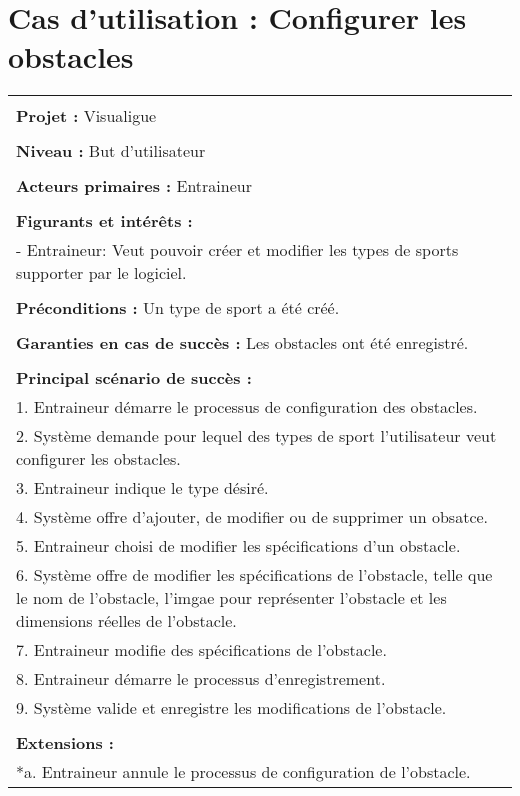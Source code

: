 \section{Cas d'utilisation : Configurer les obstacles}
\begin{longtable}{|p{16cm}|}
	\hline
	\\
	\textbf{Projet :} Visualigue\\
	\\
	\textbf{Niveau :} But d'utilisateur\\
	\\
	\textbf{Acteurs primaires :} Entraineur\\
	\\
	\textbf{Figurants et intérêts :} \\
	- Entraineur: Veut pouvoir créer et modifier les types de sports supporter par le logiciel.\\
	\\
	\textbf{Préconditions :} Un type de sport a été créé.\\
	\\
	\textbf{Garanties en cas de succès :} Les obstacles ont été enregistré.\\
	\\
	\textbf{Principal scénario de succès :}\\
	1. Entraineur démarre le processus de configuration des obstacles.\\
	2. Système demande pour lequel des types de sport l'utilisateur veut configurer les obstacles.\\
	3. Entraineur indique le type désiré.\\
	4. Système offre d'ajouter, de modifier ou de supprimer un obsatce.\\
	5. Entraineur choisi de modifier les spécifications d'un obstacle.\\
	6. Système offre de modifier les spécifications de l'obstacle, telle que le nom de l'obstacle, l'imgae pour représenter l'obstacle et les dimensions réelles de l'obstacle.\\
	7. Entraineur modifie des spécifications de l'obstacle.\\
	8. Entraineur démarre le processus d'enregistrement.\\
	9. Système valide et enregistre les modifications de l'obstacle.\\
	\\
	\textbf{Extensions :}\\
	*a. Entraineur annule le processus de configuration de l'obstacle.\\

\end{longtable}
